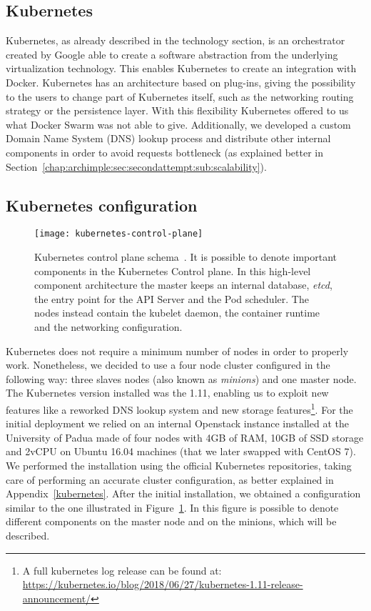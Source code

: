 \subsection{Kubernetes}
Kubernetes, as already described in the technology section, is an orchestrator
created by Google able to create a software abstraction from the underlying
virtualization technology. This enables Kubernetes to create an integration with
Docker. Kubernetes has an architecture based on plug-ins, giving the possibility
to the users to change part of Kubernetes itself, such as the networking routing
strategy or the persistence layer. With this flexibility Kubernetes offered to
us what Docker Swarm was not able to give. Additionally, we developed a custom
Domain Name System (DNS) lookup process and distribute other internal components
in order to avoid requests bottleneck (as explained better in
Section~\ref{chap:archimple:sec:secondattempt:sub:scalability}).

\subsection{Kubernetes configuration}
\label{chap:archimpl:sec:secondattempt:sec:k8s}
\begin{figure}[t]
  \centering
  \texttt{[image: kubernetes-control-plane]}
  \caption[Kubernetes control plane schema]{Kubernetes control plane
    schema~\cite{k8scp}. It is possible to denote important components in the
    Kubernetes Control plane. In this high-level component architecture the
    master keeps an internal database, \emph{etcd}, the entry point for the API
    Server and the Pod scheduler. The nodes instead contain the kubelet daemon,
    the container runtime and the networking configuration.}
  \label{chap:archimpl:sec:secondattempt:img:k8scp}
\end{figure}

Kubernetes does not require a minimum number of nodes in order to properly work.
Nonetheless, we decided to use a four node cluster configured in the following
way: three slaves nodes (also known as \emph{minions}) and one master node. The
Kubernetes version installed was the 1.11, enabling us to exploit new features
like a reworked DNS lookup system and new storage features\footnote{A full
  kubernetes log release can be found at:
  \url{https://kubernetes.io/blog/2018/06/27/kubernetes-1.11-release-announcement/}}.
For the initial deployment we relied on an internal Openstack instance installed
at the University of Padua made of four nodes with 4GB of RAM, 10GB of SSD
storage and 2vCPU on Ubuntu 16.04 machines (that we later swapped with CentOS
7). We performed the installation using the official Kubernetes repositories,
taking care of performing an accurate cluster configuration, as better explained
in Appendix~\ref{kubernetes}. After the initial installation, we obtained a
configuration similar to the one illustrated in
Figure~\ref{chap:archimpl:sec:secondattempt:img:k8scp}. In this figure is
possible to denote different components on the master node and on the minions,
which will be described.

